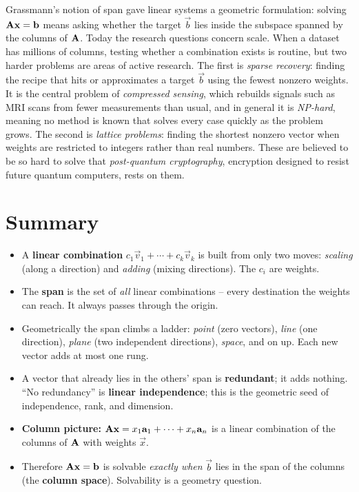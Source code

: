 \begin{historybox}
Grassmann's notion of span gave linear systems a geometric formulation: solving $\mathbf{A}\mathbf{x}=\mathbf{b}$
means asking whether the target $\vec{b}$ lies inside the subspace spanned by the columns of $\mathbf{A}$.
Today the research questions concern scale. When a dataset has millions of
columns, testing whether a combination exists is routine, but two harder problems are areas of active research.
The first is \emph{sparse recovery}: finding the recipe that hits or approximates a target $\vec{b}$ using the fewest
nonzero weights. It is the central problem of \emph{compressed sensing}, which rebuilds signals such as MRI
scans from fewer measurements than usual, and in general it is \emph{NP-hard}, meaning no method is known that
solves every case quickly as the problem grows.
The second is \emph{lattice problems}: finding the shortest nonzero vector when weights are restricted to integers rather than
real numbers. These are believed to be so hard to solve that \emph{post-quantum cryptography}, encryption designed to
resist future quantum computers, rests on them.
\end{historybox}

\section{Summary}

\begin{itemize}
  \item A \textbf{linear combination} $c_1\vec{v}_1 + \cdots + c_k\vec{v}_k$ is built from only two moves: \emph{scaling} (along a direction) and \emph{adding} (mixing directions). The $c_i$ are weights.
  \item The \textbf{span} is the set of \emph{all} linear combinations -- every destination the weights can reach. It always passes through the origin.
  \item Geometrically the span climbs a ladder: \emph{point} (zero vectors), \emph{line} (one direction), \emph{plane} (two independent directions), \emph{space}, and on up. Each new vector adds at most one rung.
  \item A vector that already lies in the others' span is \textbf{redundant}; it adds nothing. ``No redundancy'' is \textbf{linear independence}; this is the geometric seed of independence, rank, and dimension.
  \item \textbf{Column picture:} $\mathbf{A}\mathbf{x} = x_1\mathbf{a}_1 + \cdots + x_n\mathbf{a}_n$ is a linear combination of the columns of $\mathbf{A}$ with weights $\vec{x}$.
  \item Therefore $\mathbf{A}\mathbf{x}=\mathbf{b}$ is solvable \emph{exactly when} $\vec{b}$ lies in the span of the columns (the \textbf{column space}). Solvability is a geometry question.
\end{itemize}

